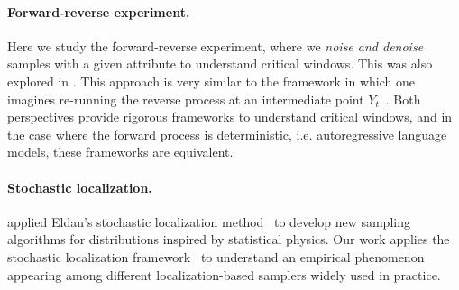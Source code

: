 \paragraph{Forward-reverse experiment.} Here we study the forward-reverse experiment, where we \emph{noise and denoise} samples with a given attribute to understand critical windows. This was also explored in \citep{li2024criticalwindowsnonasymptotictheory,sclocchi2024phasetransitiondiffusionmodels,sclocchi2024probinglatenthierarchicalstructure}. This approach is very similar to the framework in which one imagines re-running the reverse process at an intermediate point $Y_t$~\cite{georgiev2023journey,biroli2024dynamical,raya2023spontaneous}. Both perspectives provide rigorous frameworks to understand critical windows, and in the case where the forward process is deterministic, i.e. autoregressive language models, these frameworks are equivalent.
\paragraph{Stochastic localization.} 
\cite{el2022sampling,montanari2023posterior,alaoui2023sampling, montanari2023sampling, huang2024sampling} applied Eldan's stochastic localization method~\citep{eldan2013thin,eldan2020taming} to develop new sampling algorithms for distributions inspired by statistical physics. Our work applies the stochastic localization framework~\citep{montanari2023samplingdiffusionsstochasticlocalization} to understand an empirical phenomenon appearing among different localization-based samplers widely used in practice.

